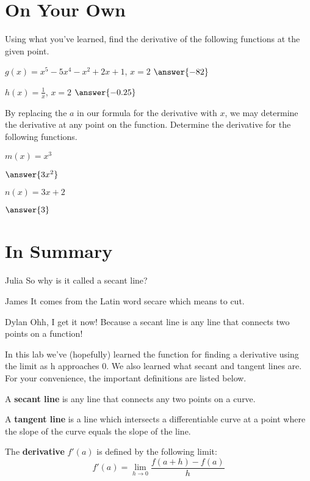 \documentclass{ximera}
\begin{document}
\section{On Your Own}
Using what you've learned, find the derivative of the following functions at the given point.
\setcounter{problem}{0}
\begin{question}
$g(x) = x^5-5x^4-x^2+2x+1$, $x=2$ $\answer{-82}$
\end{question}
\begin{question}
$h(x) = \frac{1}{x}$, $x=2$ $\answer{-0.25}$
\end{question}

By replacing the $a$ in our formula for the derivative with $x$, we may determine the derivative at any point on the function. Determine the derivative for the following functions.
\begin{question}
$m(x) = x^3$

$\answer{3x^2}$

$n(x) = 3x+2$

$\answer{3}$
\end{question}


\section{In Summary}
\begin{dialogue}
\item[Julia] So why is it called a secant line?
\item[James] It comes from the Latin word secare which means to cut.
\item[Dylan] Ohh, I get it now! Because a secant line is any line that connects two points on a function!
\end{dialogue}
In this lab we've (hopefully) learned the function for finding a derivative using the limit as h approaches 0. We also learned what secant and tangent lines are. For your convenience, the important definitions are listed below. 
\begin{definition}
 A \textbf{secant line} is any line that connects any two points on a curve.
\end{definition}
\begin{definition}
A \textbf{tangent line} is a line which intersects a differentiable curve at a point where the slope of the curve equals the slope of the line.
\end{definition}
\begin{definition}
The \textbf{derivative} $f'(a)$ is defined by the following limit:
$$f'(a)=\displaystyle \lim_{h\rightarrow 0} \frac{f(a+h)-f(a)}{h}$$
\end{definition}
\end{document}
